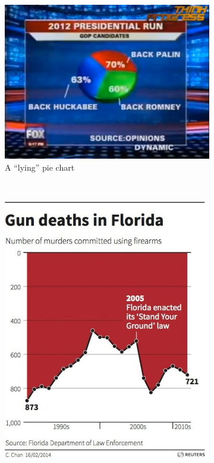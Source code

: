 \documentclass{vgtc}                          %
\begin{document}
\begin{figure}
	\centering
	\begin{subfigure}{0.45\columnwidth}
		\includegraphics[width=\textwidth]{pictures/foxpie.png}
		\caption{A ``lying'' pie chart}
		\label{fig:badpie}
	\end{subfigure}
	~
	\begin{subfigure}{0.45\columnwidth}
		\includegraphics[width=\textwidth]{pictures/gundeaths.jpg}

\end{subfigure}
\end{figure}
\end{document}
